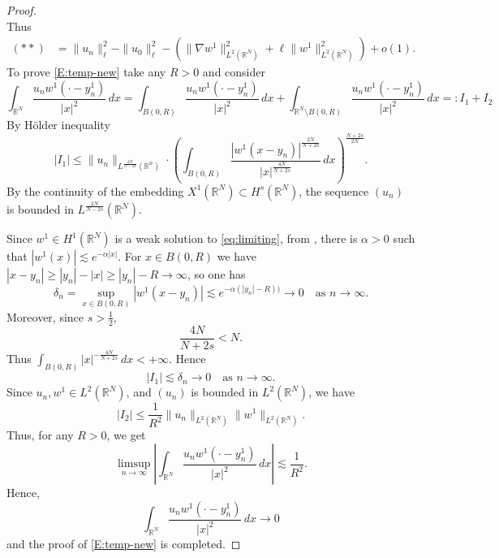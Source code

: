 \documentclass[12pt,leqno,twoside,sort]{amsart}
\newcommand{\R}{\mathbb{R}}
\numberwithin{equation}{section}
\begin{document}
\begin{proof}
$$$$
Thus
\begin{align*}
(**) &= \|u_n\|^2_\ell-\|u_0\|^2_\ell - \left( \|\nabla w^1\|_{L^2 (\R^N)}^2 + \ell \| w^1 \|_{L^2 (\R^N)}^2 \right) + o(1).
\end{align*}
To prove \eqref{E:temp-new} take any $R>0$ and consider
\[
\int_{\R^N} \frac{u_n w^1 (\cdot - y_n^1)}{|x|^2} \, dx
=\int_{B(0,R)} \frac{u_n w^1 (\cdot - y_n^1)}{|x|^2} \, dx
+\int_{\R^N\setminus B(0,R)} \frac{u_n w^1 (\cdot - y_n^1)}{|x|^2} \, dx=: I_1+I_2
\]
By H\"{o}lder inequality
\[
|I_1|\leq \|u_n\|_{L^{\frac{2N}{N-2s}}(\R^n)} \cdot 
\left(\int_{B(0,R)} \frac{|w^1(x-y_n)|^{\frac{2N}{N+2s}}}{|x|^{\frac{4N}{N+2s}}} \, dx\right)^{\frac{N+2s}{2N}}.
\]
By the continuity of the embedding $X^1(\R^N)\subset H^s(\R^N)$, the sequence $(u_n)$ is bounded in $L^{\frac{2N}{N-2s}} (\R^N)$. 

Since $w^1 \in H^1 (\R^N)$ is a weak solution to \eqref{eq:limiting}, from \cite[Theorem 2]{PankovDecay}, there is $\alpha > 0$ such that $|w^1(x)| \lesssim e^{-\alpha |x|}$. For $x\in B(0,R)$ we have $|x-y_n|\geq |y_n|-|x|\geq |y_n|-R\to\infty$, so one has
     \[
     \delta_n = \sup_{x\in B(0,R)} |w^1(x-y_n)| \lesssim  e^{-\alpha (|y_n|-R))} \to 0 \quad \mbox{as } n\to\infty.
     \]
Moreover, since $s > \frac12$,
$$
\frac{4N}{N+2s} < N.
$$
Thus $\int_{B(0,R)} |x|^{- \frac{4N}{N+2s}} \, dx < +\infty$. Hence
$$
|I_1| \lesssim \delta_n \to 0 \quad \mbox{as } n \to \infty.
$$
Since $u_n, w^1\in L^2 (\R^N)$, and $(u_n)$ is bounded in $L^2 (\R^N)$, we have
\[
|I_2| \leq \frac{1}{R^2} \|u_n\|_{L^2(\R^N)}\|w^1\|_{L^2(\R^N)}.
\]
Thus, for any $R > 0$, we get
$$
\limsup_{n\to\infty} \left| \int_{\R^N} \frac{u_n w^1 (\cdot - y_n^1)}{|x|^2} \, dx \right| \lesssim \frac{1}{R^2}.
$$
Hence,
$$
\int_{\R^N} \frac{u_n w^1 (\cdot - y_n^1)}{|x|^2} \, dx \to 0
$$
and the proof of \eqref{E:temp-new} is completed.




\end{proof}
\end{document}
